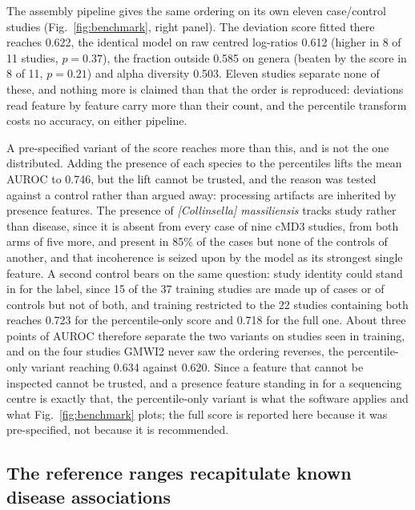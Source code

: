 \documentclass[conference]{IEEEtran}
\begin{document}
The assembly pipeline gives the same ordering on its own eleven case/control studies (Fig.~\ref{fig:benchmark}, right panel). The deviation score fitted there reaches 0.622, the identical model on raw centred log-ratios 0.612 (higher in 8 of 11 studies, $p = 0.37$), the fraction outside 0.585 on genera (beaten by the score in 8 of 11, $p = 0.21$) and alpha diversity 0.503. Eleven studies separate none of these, and nothing more is claimed than that the order is reproduced: deviations read feature by feature carry more than their count, and the percentile transform costs no accuracy, on either pipeline.

A pre-specified variant of the score reaches more than this, and is not the one distributed. Adding the presence of each species to the percentiles lifts the mean AUROC to 0.746, but the lift cannot be trusted, and the reason was tested against a control rather than argued away: processing artifacts are inherited by presence features. The presence of \textit{[Collinsella] massiliensis} tracks study rather than disease, since it is absent from every case of nine cMD3 studies, from both arms of five more, and present in 85\% of the cases but none of the controls of another, and that incoherence is seized upon by the model as its strongest single feature. A second control bears on the same question: study identity could stand in for the label, since 15 of the 37 training studies are made up of cases or of controls but not of both, and training restricted to the 22 studies containing both reaches 0.723 for the percentile-only score and 0.718 for the full one. About three points of AUROC therefore separate the two variants on studies seen in training, and on the four studies GMWI2 never saw the ordering reverses, the percentile-only variant reaching 0.634 against 0.620. Since a feature that cannot be inspected cannot be trusted, and a presence feature standing in for a sequencing centre is exactly that, the percentile-only variant is what the software applies and what Fig.~\ref{fig:benchmark} plots; the full score is reported here because it was pre-specified, not because it is recommended.

\subsection{The reference ranges recapitulate known disease associations}
\end{document}
